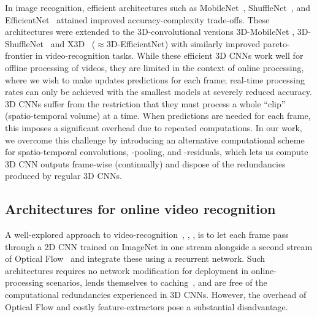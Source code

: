In image recognition, efficient architectures such as MobileNet~\cite{howard2017mobilenet}, ShuffleNet~\cite{zhang2018shufflenet}, and EfficientNet~\cite{mingxing2019efficientnet} attained improved accuracy-complexity trade-offs.
These architectures were extended to the 3D-convolutional versions {3D-MobileNet} \cite{kopulku2019resource}, {3D-ShuffleNet}~\cite{kopulku2019resource} and X3D~\cite{feichtenhofer2020x3d} ($\approx${3D-EfficientNet}) with similarly improved pareto-frontier in video-recognition tasks. 
While these efficient 3D CNNs work well for offline processing of videos, they are limited in the context of online processing, where we wish to make updates predictions for each frame; real-time processing rates can only be achieved with the smallest models at severely reduced accuracy.
3D CNNs suffer from the restriction that they must process a whole ``clip'' (spatio-temporal volume) at a time. %
When predictions are needed for each frame, this imposes a significant overhead due to repeated computations. %
In our work, we overcome this challenge by introducing an alternative computational scheme for spatio-temporal convolutions, -pooling, and -residuals, which lets us compute 3D CNN outputs frame-wise (continually) and dispose of the redundancies produced by regular 3D CNNs.


\vspace{-3pt}
\subsection{Architectures for online video recognition}
\vspace{-3pt}

A well-explored approach to video-recognition~\cite{donahue2015longterm}, \cite{yuehei2015beyond}, \cite{kalogeiton2017action}, \cite{singh2017online} is to let each frame pass through a 2D CNN trained on ImageNet in one stream alongside a second stream of Optical Flow~\cite{farneback2003twoframe} and integrate these using a recurrent network. %
Such architectures requires no network modification for deployment in online-processing scenarios, lends themselves to caching~\cite{xu2018deepcache}, and are free of the computational redundancies experienced in 3D CNNs.
However, the overhead of Optical Flow and costly feature-extractors pose a substantial disadvantage.

